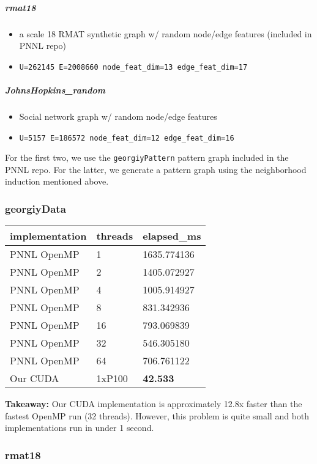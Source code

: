 \documentclass[10pt,oneside]{memoir}
\providecommand{\tightlist}{%
  \setlength{\itemsep}{0pt}\setlength{\parskip}{0pt}}
\let\oldsubparagraph\subparagraph
\renewcommand{\subparagraph}[1]{\oldsubparagraph{#1}\mbox{}}
\begin{document}
\hypertarget{rmat18}{%
\subparagraph{rmat18}\label{rmat18}}

\begin{itemize}
\tightlist
\item
  a scale 18 RMAT synthetic graph w/ random node/edge features (included
  in PNNL repo)
\item
  \texttt{\textbar{}U\textbar{}=262145\ \textbar{}E\textbar{}=2008660\ node\_feat\_dim=13\ edge\_feat\_dim=17}
\end{itemize}

\hypertarget{johnshopkins_random}{%
\subparagraph{JohnsHopkins\_random}\label{johnshopkins_random}}

\begin{itemize}
\tightlist
\item
  Social network graph w/ random node/edge features
\item
  \texttt{\textbar{}U\textbar{}=5157\ \textbar{}E\textbar{}=186572\ node\_feat\_dim=12\ edge\_feat\_dim=16}
\end{itemize}

For the first two, we use the \texttt{georgiyPattern} pattern graph
included in the PNNL repo. For the latter, we generate a pattern graph
using the neighborhood induction mentioned above.

\hypertarget{georgiydata-1}{%
\subsubsection{georgiyData}\label{georgiydata-1}}

\begin{longtable}[]{@{}lll@{}}
\toprule
implementation & threads & elapsed\_ms\tabularnewline
\midrule
\endhead
PNNL OpenMP & 1 & 1635.774136\tabularnewline
PNNL OpenMP & 2 & 1405.072927\tabularnewline
PNNL OpenMP & 4 & 1005.914927\tabularnewline
PNNL OpenMP & 8 & 831.342936\tabularnewline
PNNL OpenMP & 16 & 793.069839\tabularnewline
PNNL OpenMP & 32 & 546.305180\tabularnewline
PNNL OpenMP & 64 & 706.761122\tabularnewline
Our CUDA & 1xP100 & \textbf{42.533}\tabularnewline
\bottomrule
\end{longtable}

\textbf{Takeaway:} Our CUDA implementation is approximately 12.8x faster
than the fastest OpenMP run (32 threads). However, this problem is quite
small and both implementations run in under 1 second.

\hypertarget{rmat18-1}{%
\subsubsection{rmat18}\label{rmat18-1}}
\end{document}
